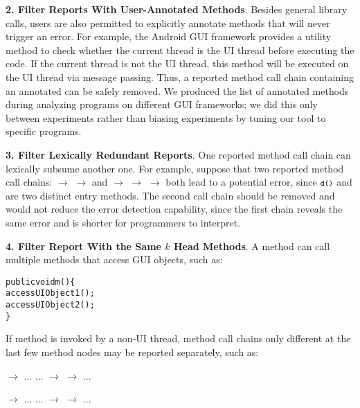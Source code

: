 \textbf{2. Filter Reports With User-Annotated Methods}. Besides general
library calls, users are also permitted to explicitly annotate methods
that will never trigger an error.
For example, the Android GUI framework provides a utility method 
 to check whether the current thread is the UI thread
before executing the code. If the current thread is not the UI thread,
this method will be executed on the UI thread via message passing.
Thus, a reported method call chain containing an annotated 
can be safely removed. We produced the list of annotated methods
during analyzing programs on different GUI frameworks; we did this
only between experiments rather than biasing experiments by tuning
our tool to specific programs.

\textbf{3. Filter Lexically Redundant Reports}. One reported method call
chain can lexically subsume another one. For example, suppose that two
reported method call chains:  $\rightarrow$ 
$\rightarrow$  and 
 $\rightarrow$  $\rightarrow$  $\rightarrow$ 
both lead to a potential error, since $\CodeIn{d()}$ and 
are two distinct entry methods. The second call chain should
be removed and would not reduce the error detection capability, since
the first chain reveals the same error and is shorter 
for programmers to interpret.


\textbf{4. Filter Report With the Same $k$ Head Methods}. A method can call
multiple methods that access GUI objects, such as:

\begin{CodeOut}
\begin{alltt}
     public void m() \{
         accessUIObject1();
         accessUIObject2();
     \}
\end{alltt}
\end{CodeOut}
If method  is invoked by a non-UI thread, method call chains
only different at the last few method nodes may be reported separately, such as:

 $\rightarrow$ ... ... $\rightarrow$  $\rightarrow$  ...

 $\rightarrow$ ... ... $\rightarrow$  $\rightarrow$  ...

